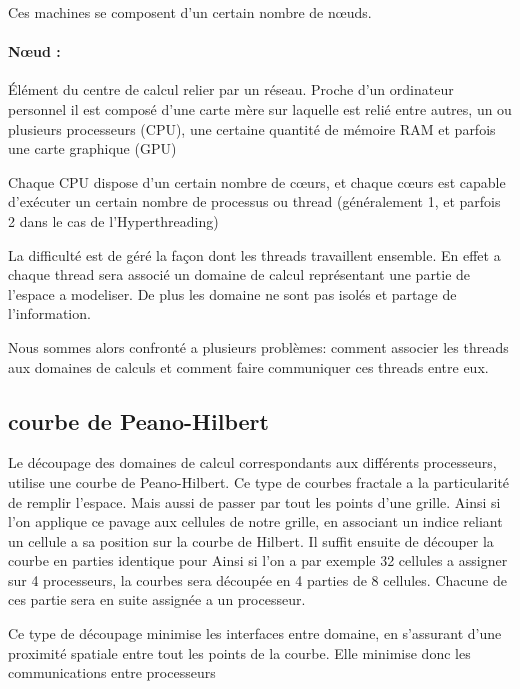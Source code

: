 Ces machines se composent d'un certain nombre de nœuds.

\paragraph{Nœud :} Élément du centre de calcul relier par un réseau.
Proche d'un ordinateur personnel il est composé d'une carte mère sur laquelle est relié entre autres, un ou plusieurs processeurs (CPU), une certaine quantité de mémoire RAM et parfois une carte graphique (GPU)

Chaque CPU dispose d'un certain nombre de cœurs, et chaque cœurs est capable d'exécuter un certain nombre de processus ou thread (généralement 1, et parfois 2 dans le cas de l'Hyperthreading)

La difficulté est de géré la façon dont les threads travaillent ensemble.
En effet a chaque thread sera associé un domaine de calcul représentant une partie de l'espace a modeliser.
De plus les domaine ne sont pas isolés et partage de l'information. 

Nous sommes alors confronté a plusieurs problèmes: comment associer les threads aux domaines de calculs  et comment faire communiquer ces threads entre eux.

\subsection{courbe de Peano-Hilbert}



Le découpage des domaines de calcul correspondants aux différents processeurs,  utilise une courbe de Peano-Hilbert.
Ce type de courbes fractale a la particularité de remplir l'espace.
Mais aussi de passer par tout les points d'une grille.
Ainsi si l'on applique ce pavage aux cellules de notre grille, en associant un indice reliant un cellule a sa position sur la courbe de Hilbert.
Il suffit ensuite de découper la courbe en parties identique  pour 
Ainsi si l'on a par exemple  32 cellules a assigner sur 4 processeurs, la courbes sera découpée en 4 parties de 8 cellules.
Chacune de ces partie sera en suite assignée a un processeur.

Ce type de découpage minimise les interfaces entre domaine, en s'assurant d'une proximité spatiale entre tout les points de la courbe.
Elle minimise donc les communications entre processeurs

